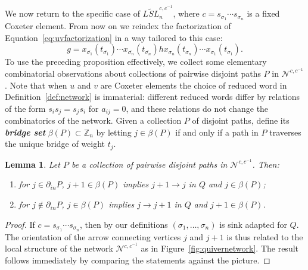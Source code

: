 \documentclass[12pt]{amsart}
\newcommand{\newword}[1]{\textbf{\emph{#1}}}
\newcommand{\ZZ}{\mathbb{Z}}
\newcommand{\cN}{\mathcal{N}} %
\newcommand{\ol}[1]{\overline{#1}}
\newtheorem{lemma}[theorem]{Lemma}
\theoremstyle{remark}
\numberwithin{equation}{section}
\numberwithin{figure}{section}
\begin{document}
We now return to the specific case of $\widetilde{LSL}_n^{c,c^{-1}}$, where $c = s_{\sigma_1}\cdots s_{\sigma_{n}}$ is a fixed Coxeter element.
From now on we reindex the factorization of Equation~\eqref{eq:uvfactorization} in a way tailored to this case:
\begin{equation}
  \label{eq:coxfactorization}
  g = x_{\ol{\sigma_1}}(t_{\ol{\sigma_1}}) \cdots x_{\ol{\sigma_n}}(t_{\ol{\sigma_n}})h x_{\sigma_n}(t_{\sigma_n}) \cdots x_{\sigma_1}(t_{\sigma_1}).
\end{equation}
To use the preceding proposition effectively, we collect some elementary combinatorial observations about collections of pairwise disjoint paths $P$ in $\cN^{c,c^{-1}}$.
Note that when $u$ and $v$ are Coxeter elements the choice of reduced word in Definition~\ref{def:network} is immaterial: different reduced words differ by relations of the form $s_i s_j = s_j s_i$ for $a_{ij} = 0$, and these relations do not change the combinatorics of the network.
Given a collection $P$ of disjoint paths, define its \newword{bridge set} $\beta(P)\subset\ZZ_n$ by letting $j\in\beta(P)$ if and only if a path in $P$ traverses the unique bridge of weight $t_j$.

\begin{lemma}
  \label{lem:phi}
  Let $P$ be a collection of pairwise disjoint paths in $\cN^{c,c^{-1}}$.
  Then:
  \begin{enumerate}
    \item for $j\in\partial_{in}P$, $j+1\in\beta(P)$ implies $j+1\to j$ in $Q$ and $j\in\beta(P)$;
    \item for $j\notin\partial_{in}P$, $j\in\beta(P)$ implies $j\to j+1$ in $Q$ and $j+1\in\beta(P)$.
  \end{enumerate}
\end{lemma}
\begin{proof}
  If $c = s_{\sigma_1}\cdots s_{\sigma_{n}}$, then by our definitions $(\sigma_1,\ldots,\sigma_{n})$ is sink adapted for $Q$.
  The orientation of the arrow connecting vertices $j$ and $j+1$ is thus related to the local structure of the network $\cN^{c,c^{-1}}$ as in Figure~\ref{fig:quivernetwork}.
  The result follows immediately by comparing the statements against the picture.
\end{proof}
\end{document}
